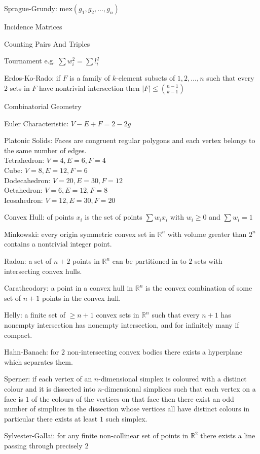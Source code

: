 Sprague-Grundy: $\text{mex}({g_1,g_2,\dots,g_n})$

Incidence Matrices

Counting Pairs And Triples

Tournament e.g. $\sum w_i^2 = \sum l_i^2$

Erdos-Ko-Rado: if $F$ is a family of $k$-element subsets of ${1,2, \dots,n}$ such that every $2$ sets in $F$ have nontrivial intersection then $|F| \le \binom{n-1}{k-1}$

Combinatorial Geometry

Euler Characteristic: $V-E+F=2-2g$

Platonic Solids: Faces are congruent regular polygons and each vertex belongs to the same number of edges. \\
Tetrahedron: $V=4, E=6, F=4$ \\
Cube: $V=8, E=12, F=6$ \\
Dodecahedron: $V=20, E=30, F=12$ \\
Octahedron: $V=6, E=12, F=8$ \\
Icosahedron: $V=12, E=30, F=20$

Convex Hull: of points $x_i$ is the set of points $\sum w_i x_i$ with $w_i \ge 0$ and $\sum w_i = 1$

Minkowski: every origin symmetric convex set in $\mathbb{R}^n$ with volume greater than $2^n$ contains a nontrivial integer point.

Radon: a set of $n+2$ points in $\mathbb{R}^n$ can be partitioned in to $2$ sets with intersecting convex hulls.

Caratheodory: a point in a convex hull in $\mathbb{R}^n$ is the convex combination of some set of $n+1$ points in the convex hull.

Helly: a finite set of $\ge n+1$ convex sets in $\mathbb{R}^n$ such that every $n+1$ has nonempty intersection has nonempty intersection, and for infinitely many if compact.

Hahn-Banach: for $2$ non-intersecting convex bodies there exists a hyperplane which separates them.

Sperner: if each vertex of an $n$-dimensional simplex is coloured with a distinct colour and it is dissected into $n$-dimensional simplices such that each vertex on a face is $1$ of the colours of the vertices on that face then there exist an odd number of simplices in the dissection whose vertices all have distinct colours in particular there exists at least $1$ such simplex.

Sylvester-Gallai: for any finite non-collinear set of points in $\mathbb{R}^2$ there exists a line passing through precisely $2$

